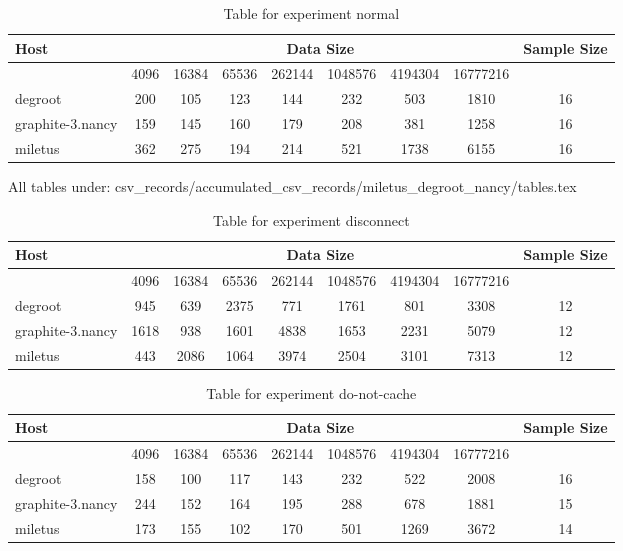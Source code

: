 \begin{table}
\caption{Table for experiment normal}
\begin{tabular}{@{}lcccccccc@{}}
\toprule
Host    & \multicolumn{7}{c}{Data Size}          & Sample Size \\ \midrule
& 4096  & 16384  & 65536  & 262144  & 1048576  & 4194304  & 16777216              \\ \midrule
degroot  & 200  & 105  & 123  & 144  & 232  & 503  & 1810  & 16 \\
graphite-3.nancy  & 159  & 145  & 160  & 179  & 208  & 381  & 1258  & 16 \\
miletus  & 362  & 275  & 194  & 214  & 521  & 1738  & 6155  & 16 \\
\bottomrule
\end{tabular}
\end{table}

All tables under: csv_records/accumulated_csv_records/miletus_degroot_nancy/tables.tex
\begin{table}
\caption{Table for experiment disconnect}
\begin{tabular}{@{}lcccccccc@{}}
\toprule
Host    & \multicolumn{7}{c}{Data Size}          & Sample Size \\ \midrule
& 4096  & 16384  & 65536  & 262144  & 1048576  & 4194304  & 16777216              \\ \midrule
degroot  & 945  & 639  & 2375  & 771  & 1761  & 801  & 3308  & 12 \\
graphite-3.nancy  & 1618  & 938  & 1601  & 4838  & 1653  & 2231  & 5079  & 12 \\
miletus  & 443  & 2086  & 1064  & 3974  & 2504  & 3101  & 7313  & 12 \\
\bottomrule
\end{tabular}
\end{table}

\begin{table}
\caption{Table for experiment do-not-cache}
\begin{tabular}{@{}lcccccccc@{}}
\toprule
Host    & \multicolumn{7}{c}{Data Size}          & Sample Size \\ \midrule
& 4096  & 16384  & 65536  & 262144  & 1048576  & 4194304  & 16777216              \\ \midrule
degroot  & 158  & 100  & 117  & 143  & 232  & 522  & 2008  & 16 \\
graphite-3.nancy  & 244  & 152  & 164  & 195  & 288  & 678  & 1881  & 15 \\
miletus  & 173  & 155  & 102  & 170  & 501  & 1269  & 3672  & 14 \\
\bottomrule
\end{tabular}
\end{table}

